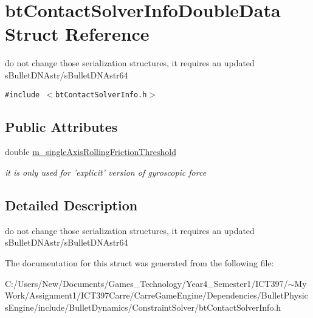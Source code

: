 \hypertarget{structbt_contact_solver_info_double_data}{
\section{btContactSolverInfoDoubleData Struct Reference}
\label{structbt_contact_solver_info_double_data}
}
do not change those serialization structures, it requires an updated sBulletDNAstr/sBulletDNAstr64  


{\tt \#include $<$btContactSolverInfo.h$>$}

\subsection*{Public Attributes}
\begin{CompactItemize}
\item 
\hypertarget{structbt_contact_solver_info_double_data_9fb9abe1a4fa5c342f93fe3867093d31}{
double \hyperlink{structbt_contact_solver_info_double_data_9fb9abe1a4fa5c342f93fe3867093d31}{m\_\-singleAxisRollingFrictionThreshold}}
\label{structbt_contact_solver_info_double_data_9fb9abe1a4fa5c342f93fe3867093d31}

\begin{CompactList}\small\item\em it is only used for 'explicit' version of gyroscopic force \item\end{CompactList}\end{CompactItemize}


\subsection{Detailed Description}
do not change those serialization structures, it requires an updated sBulletDNAstr/sBulletDNAstr64 

The documentation for this struct was generated from the following file:\begin{CompactItemize}
\item 
C:/Users/New/Documents/Games\_\-Technology/Year4\_\-Semester1/ICT397/$\sim$My Work/Assignment1/ICT397Carre/CarreGameEngine/Dependencies/BulletPhysicsEngine/include/BulletDynamics/ConstraintSolver/btContactSolverInfo.h\end{CompactItemize}
